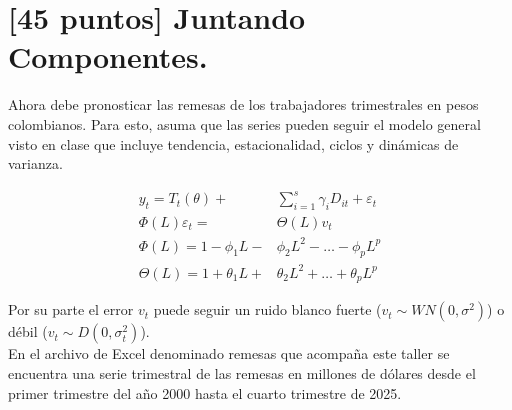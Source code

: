 \documentclass{article}
\theoremstyle{remark}
\theoremstyle{definition}
\begin{document}
\section{[45 puntos] Juntando Componentes.}

{Ahora debe pronosticar las remesas de los trabajadores trimestrales en pesos colombianos. Para esto, asuma que las series pueden seguir el modelo general visto en clase que incluye tendencia, estacionalidad, ciclos y din\'amicas de varianza.}

\begin{align*}
    y_t = T_t(\theta) +& \sum_{i=1}^{s} \gamma_i D_{it} + \varepsilon_t \\
    \Phi(L) \varepsilon_t =& \Theta(L) v_t \\
    \Phi(L) = 1 - \phi_1 L -& \phi_2 L^2 - \dots - \phi_p L^p \\
    \Theta(L) = 1 + \theta_1 L +& \theta_2 L^2 + \dots + \theta_p L^p
\end{align*}

{Por su parte el error $v_t$ puede seguir un ruido blanco fuerte ($v_t\sim WN(0,
\sigma^2)$) o d\'ebil ($v_t\sim D(0,\sigma_t^2)$).} \\

{En el archivo de Excel denominado remesas que acompaña este taller se encuentra una serie trimestral de las remesas en millones de d\'olares desde el primer trimestre del año 2000 hasta el cuarto trimestre de 2025.}
\end{document}

